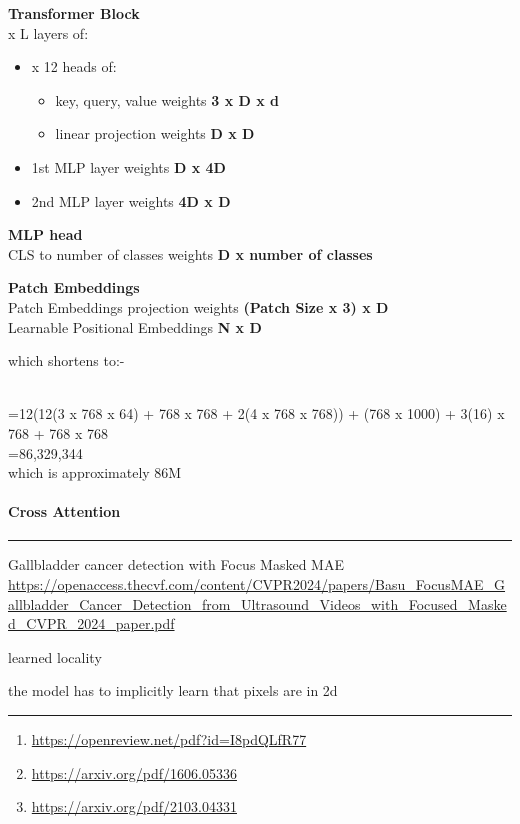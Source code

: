 \documentclass[
]{article}
\providecommand{\tightlist}{%
  \setlength{\itemsep}{0pt}\setlength{\parskip}{0pt}}
\begin{document}
\textbf{Transformer Block}\\
x L layers of:

\begin{itemize}
\tightlist
\item
  x 12 heads of:

  \begin{itemize}
  \tightlist
  \item
    key, query, value weights \textbf{3 x D x d{}}
  \item
    linear projection weights \textbf{D x D}
  \end{itemize}
\item
  1st MLP layer weights \textbf{D x 4D}
\item
  2nd MLP layer weights \textbf{4D x D}
\end{itemize}

\textbf{MLP head}\\
CLS to number of classes weights \textbf{D x number of classes}

\textbf{Patch Embeddings}\\
Patch Embeddings projection weights \textbf{(Patch Size x 3) x D}\\
Learnable Positional Embeddings \textbf{N x D}

which shortens to:-\\
{}\strut \\
=12(12(3 x 768 x 64) + 768 x 768 + 2(4 x 768 x 768)) + (768 x 1000) +
3(16) x 768 + 768 x 768\\
=86,329,344\\
which is approximately 86M

\paragraph{Cross Attention}\label{cross-attention}

\begin{center}\rule{0.5\linewidth}{0.5pt}\end{center}

Gallbladder cancer detection with Focus Masked MAE\\
\url{https://openaccess.thecvf.com/content/CVPR2024/papers/Basu_FocusMAE_Gallbladder_Cancer_Detection_from_Ultrasound_Videos_with_Focused_Masked_CVPR_2024_paper.pdf}

learned locality

the model has to implicitly learn that pixels are in 2d

\begin{center}\rule{0.5\linewidth}{0.5pt}\end{center}

\begin{enumerate}
\item
  \label{fn-1-3a762d0062c52d14}
  \url{https://openreview.net/pdf?id=I8pdQLfR77}
\item
  \label{fn-2-3a762d0062c52d14}
  \url{https://arxiv.org/pdf/1606.05336}
\item
  \label{fn-3-3a762d0062c52d14}
  \url{https://arxiv.org/pdf/2103.04331}
\end{enumerate}
\end{document}
